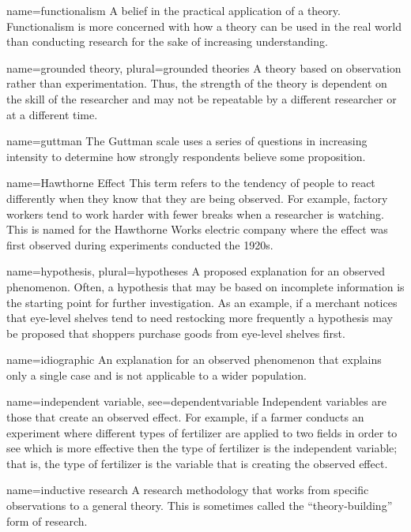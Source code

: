 {name={functionalism}}
{%
	A belief in the practical application of a theory. Functionalism is more concerned with how a theory can be used in the real world than conducting	research for the sake of increasing understanding. 
}

{name={grounded theory},
	plural={grounded theories}}
{%
	A theory based on observation rather than experimentation. Thus, the strength of the theory is dependent on the skill of the researcher and may not be repeatable by a different researcher or at a different time.
}

{name={guttman}}
{%
	The Guttman scale uses a series of questions in increasing intensity to determine how strongly respondents believe some proposition. 
}

{name={Hawthorne Effect}}
{%
	This term refers to the tendency of people to react differently when they know that they are being observed. For example, factory workers tend to work harder with fewer breaks when a researcher is watching. This is named for the Hawthorne Works electric company where the effect was first observed during experiments conducted the 1920s.
}

{name={hypothesis},
	plural={hypotheses}}
{%
	A proposed explanation for an observed phenomenon. Often, a hypothesis that may be based on incomplete information is the starting point for further investigation. As an example, if a merchant notices that eye-level shelves tend to need restocking more frequently a hypothesis may be proposed that shoppers purchase goods from eye-level shelves first. 
}

{name={idiographic}}
{%
	An explanation for an observed phenomenon that explains only a single case and is not applicable to a wider population.
}

{name={independent variable},
	see={dependentvariable}}
{%
	Independent variables are those that create an observed effect. For example, if a farmer conducts an experiment where different types of fertilizer are applied to two fields in order to see which is more effective then the type of fertilizer is the independent variable; that is, the type of fertilizer is the variable that is creating the observed effect.
}

{name={inductive research}}
{%
	A research methodology that works from specific observations to a general theory. This is sometimes called the ``theory-building'' form of research.
}

